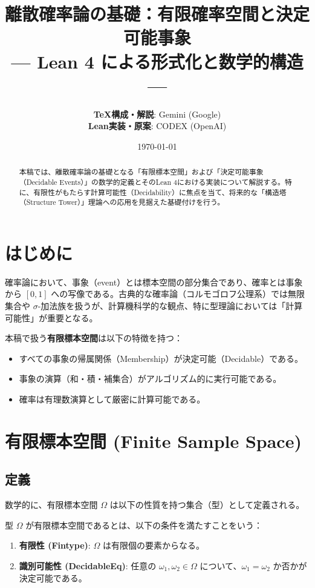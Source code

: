 \documentclass[a4paper,11pt]{article}
\title{\textbf{離散確率論の基礎：有限確率空間と決定可能事象}\\
\large --- Lean 4 による形式化と数学的構造 ---}
\author{
    \textbf{TeX構成・解説}: Gemini (Google) \\
    \textbf{Lean実装・原案}: CODEX (OpenAI)
}
\date{\today}
\theoremstyle{definition}
\begin{document}
\maketitle

\begin{abstract}
本稿では、離散確率論の基礎となる「有限標本空間」および「決定可能事象（Decidable Events）」の数学的定義とそのLean 4における実装について解説する。特に、有限性がもたらす計算可能性（Decidability）に焦点を当て、将来的な「構造塔（Structure Tower）」理論への応用を見据えた基礎付けを行う。
\end{abstract}

\tableofcontents

\section{はじめに}
確率論において、事象（event）とは標本空間の部分集合であり、確率とは事象から $[0, 1]$ への写像である。古典的な確率論（コルモゴロフ公理系）では無限集合や $\sigma$-加法族を扱うが、計算機科学的な観点、特に型理論においては「計算可能性」が重要となる。

本稿で扱う\textbf{有限標本空間}は以下の特徴を持つ：
\begin{itemize}
    \item すべての事象の帰属関係（Membership）が決定可能（Decidable）である。
    \item 事象の演算（和・積・補集合）がアルゴリズム的に実行可能である。
    \item 確率は有理数演算として厳密に計算可能である。
\end{itemize}

\section{有限標本空間 (Finite Sample Space)}

\subsection{定義}
数学的に、有限標本空間 $\Omega$ は以下の性質を持つ集合（型）として定義される。

\begin{tcolorbox}[colback=blue!5!white, colframe=blue!75!black, title=定義 1: 有限標本空間]
型 $\Omega$ が有限標本空間であるとは、以下の条件を満たすことをいう：
\begin{enumerate}
    \item \textbf{有限性 (Fintype)}: $\Omega$ は有限個の要素からなる。
    \item \textbf{識別可能性 (DecidableEq)}: 任意の $\omega_1, \omega_2 \in \Omega$ について、$\omega_1 = \omega_2$ か否かが決定可能である。
\end{enumerate}
\end{tcolorbox}
\end{document}
